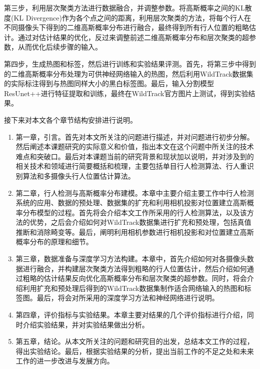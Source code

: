 第三步，利用层次聚类方法进行数据融合，并调整参数。将高斯概率之间的KL散度(KL Divergence)作为各个点之间的距离，利用层次聚类的方法，将每个行人在不同摄像头下得到的二维高斯概率分布进行融合，最终得到所有行人位置的粗略估计。通过对估计结果的优化，反过来调整前述二维高斯概率分布和层次聚类的超参数，从而优化后续步骤的输入。

第四步，生成热图和标签，然后进行训练和实验结果评测。首先，将第三步中得到的二维高斯概率分布处理为可供神经网络输入的热图，然后利用WildTrack数据集的实际标注得到与热图同样大小的黑白标签图。最后，输入分割模型ResUnet++\cite{jha2019resunet}进行特征提取和训练，最终在WildTrack官方图片上测试，得到实验结果。

接下来对本文各个章节结构安排进行说明。

\begin{enumerate}
  \item 第一章，引言。首先对本文所关注的问题进行描述，并对问题进行初步分解。然后阐述本课题研究的实际意义和价值，指出本文在这个问题中所关注的技术难点和突破口。最后对本课题当前的研究背景和现状加以说明，并对涉及到的相关技术和领域进行简要概括和梳理，主要包括单目行人检测算法、行人重识别算法和多摄像头行人位置估计算法。
  \item 第二章，行人检测与高斯概率分布建模。本章中主要介绍主要工作中行人检测系统的应用、数据的预处理、数据集的扩充和利用相机投影对位置建立高斯概率分布模型的过程。首先将会介绍本文工作所采用的行人检测算法，以及该方法的优势，之后会介绍如何对WildTrack数据集进行扩充和预处理，包括真值推断和消除畸变等。最后，阐明利用相机参数进行相机投影和对位置建立高斯概率分布的原理和细节。
  \item 第三章，数据准备与深度学习方法构建。本章中，首先介绍如何对各摄像头数据进行融合，并构建层次聚类方法得到粗略的行人位置估计，然后介绍如何通过粗略的估计结果反向优化高斯概率分布和层次聚类的超参数。同时，将会介绍利用扩充和预处理后得到的WildTrack数据集制作适合网络输入的热图和标签图。最后，将会对所采用的深度学习方法和神经网络进行说明。
  \item 第四章，评价指标与实验结果。本章主要对结果的几个评价指标进行介绍，同时介绍实验结果，并对实验结果做出分析。
  \item 第五章，结论。从本文所关注的问题和研究目的出发，总结本文工作的过程，得出实验结论。最后，根据实验结果的分析，提出当前工作的不足之处和未来工作的进一步改进与发展方向。
\end{enumerate}
